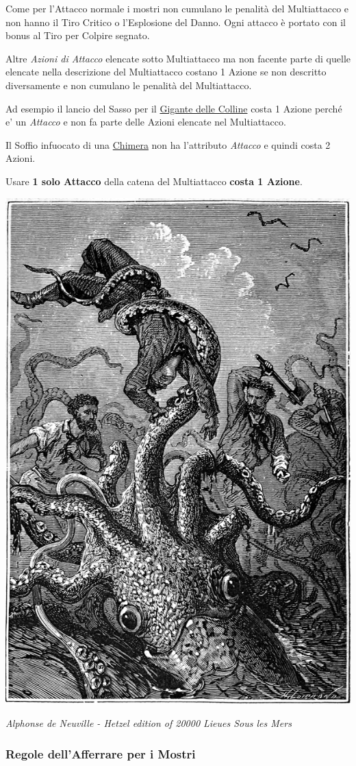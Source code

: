 \begin{multicols}{2}
Come per l'Attacco normale i mostri non cumulano le penalità del Multiattacco e non hanno il Tiro Critico o l'Esplosione del Danno. Ogni attacco è portato con il bonus al Tiro per Colpire segnato.

Altre \emph{Azioni di Attacco} elencate sotto Multiattacco ma non facente parte di quelle elencate nella descrizione del Multiattacco costano 1 Azione se non descritto diversamente e non cumulano le penalità del Multiattacco.

Ad esempio il lancio del Sasso per il \hyperlink{Gigante delle Colline}{Gigante delle Colline} costa 1 Azione perché e' un \emph{Attacco} e non fa parte delle Azioni elencate nel Multiattacco.

Il Soffio infuocato di una \hyperlink{Chimera}{Chimera} non ha l'attributo \emph{Attacco} e quindi costa 2 Azioni.

Usare \textbf{1 solo Attacco} della catena del Multiattacco \textbf{costa 1 Azione}.


\begin{center}
	\includegraphics[width=0.65\linewidth]{immagini/polpo.png}

	\emph{Alphonse de Neuville - Hetzel edition of 20000 Lieues Sous les Mers}
\end{center}

\subsubsection{Regole dell'Afferrare per i Mostri}


\end{multicols}

